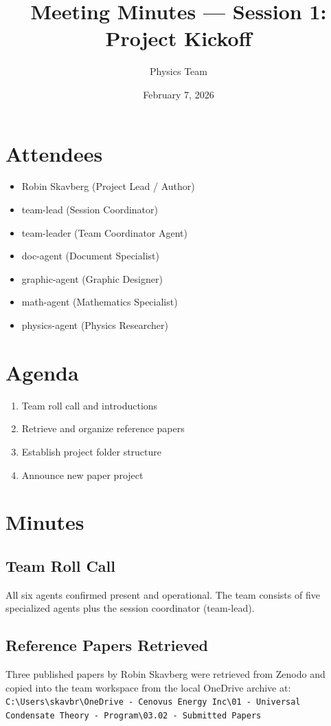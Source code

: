 \documentclass[11pt,a4paper]{article}
\title{\textbf{Meeting Minutes --- Session 1: Project Kickoff}}
\author{Physics Team}
\date{February 7, 2026}
\begin{document}
\maketitle

\section{Attendees}
\begin{itemize}
    \item Robin Skavberg (Project Lead / Author)
    \item team-lead (Session Coordinator)
    \item team-leader (Team Coordinator Agent)
    \item doc-agent (Document Specialist)
    \item graphic-agent (Graphic Designer)
    \item math-agent (Mathematics Specialist)
    \item physics-agent (Physics Researcher)
\end{itemize}

\section{Agenda}
\begin{enumerate}
    \item Team roll call and introductions
    \item Retrieve and organize reference papers
    \item Establish project folder structure
    \item Announce new paper project
\end{enumerate}

\section{Minutes}

\subsection{Team Roll Call}
All six agents confirmed present and operational. The team consists of five specialized agents plus the session coordinator (team-lead).

\subsection{Reference Papers Retrieved}
Three published papers by Robin Skavberg were retrieved from Zenodo and copied into the team workspace from the local OneDrive archive at:
\texttt{C:\textbackslash Users\textbackslash skavbr\textbackslash OneDrive - Cenovus Energy Inc\textbackslash 01 - Universal Condensate Theory - Program\textbackslash 03.02 - Submitted Papers}
\end{document}
